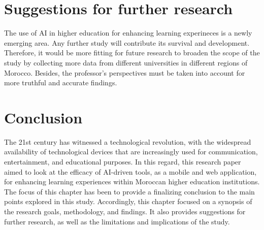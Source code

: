 \section{Suggestions for further research}
The use of AI in higher education for enhancing learning experineces is a newly emerging area.
Any further study will contribute its survival and development. Therefore, it would be more fitting
for future research to broaden the scope of the study by collecting more data from different
universities in different regions of Morocco. Besides, the professor’s perspectives must be
taken into account for more truthful and accurate findings.
\section{Conclusion}
The 21st century has witnessed a technological revolution, with the widespread 
availability of technological devices that are increasingly used for 
communication, entertainment, and educational purposes. In this regard, this research paper aimed to look at the efficacy of
AI-driven tools, as a mobile and web application, for enhancing learning experiences within
Moroccan higher education institutions. The focus of
this chapter has been to provide a finalizing conclusion to the main points explored in this
study. Accordingly, this chapter focused on a synopsis of the research goals, methodology,
and findings. It also provides suggestions for further research, as well as the limitations and
implications of the study.
